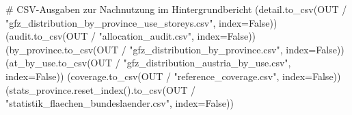 \documentclass[
  ngerman,
  a4paper,
  DIV=11]{scrreprt}
\newenvironment{Shaded}{\begin{snugshade}}{\end{snugshade}}
\newcommand{\CommentTok}[1]{\textcolor[rgb]{0.37,0.37,0.37}{#1}}
\newcommand{\NormalTok}[1]{\textcolor[rgb]{0.00,0.23,0.31}{#1}}
\newcommand{\OperatorTok}[1]{\textcolor[rgb]{0.37,0.37,0.37}{#1}}
\newcommand{\StringTok}[1]{\textcolor[rgb]{0.13,0.47,0.30}{#1}}
\newcommand{\VariableTok}[1]{\textcolor[rgb]{0.07,0.07,0.07}{#1}}
\begin{document}
\begin{Shaded}
\begin{Highlighting}[]
\CommentTok{\# CSV{-}Ausgaben zur Nachnutzung im Hintergrundbericht}
\NormalTok{(detail.to\_csv(OUT }\OperatorTok{/} \StringTok{"gfz\_distribution\_by\_province\_use\_storeys.csv"}\NormalTok{, index}\OperatorTok{=}\VariableTok{False}\NormalTok{))}
\NormalTok{(audit.to\_csv(OUT }\OperatorTok{/} \StringTok{"allocation\_audit.csv"}\NormalTok{, index}\OperatorTok{=}\VariableTok{False}\NormalTok{))}
\NormalTok{(by\_province.to\_csv(OUT }\OperatorTok{/} \StringTok{"gfz\_distribution\_by\_province.csv"}\NormalTok{, index}\OperatorTok{=}\VariableTok{False}\NormalTok{))}
\NormalTok{(at\_by\_use.to\_csv(OUT }\OperatorTok{/} \StringTok{"gfz\_distribution\_austria\_by\_use.csv"}\NormalTok{, index}\OperatorTok{=}\VariableTok{False}\NormalTok{))}
\NormalTok{(coverage.to\_csv(OUT }\OperatorTok{/} \StringTok{"reference\_coverage.csv"}\NormalTok{, index}\OperatorTok{=}\VariableTok{False}\NormalTok{))}
\NormalTok{(stats\_province.reset\_index().to\_csv(OUT }\OperatorTok{/} \StringTok{"statistik\_flaechen\_bundeslaender.csv"}\NormalTok{, index}\OperatorTok{=}\VariableTok{False}\NormalTok{))}


\end{Highlighting}
\end{Shaded}
\end{document}
